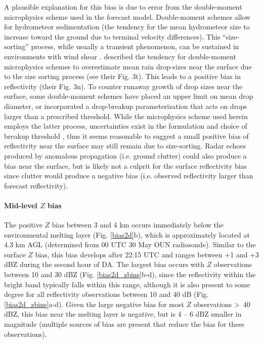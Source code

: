 A plausible explanation for this bias is due to error from the double-moment microphysics scheme used in the forecast model. Double-moment schemes allow for hydrometeor sedimentation (the tendency for the mean hydrometeor size to increase toward the ground due to terminal velocity differences). This “size-sorting” process, while usually a transient phenomenon, can be sustained in environments with wind shear \citep{kumjianryzhkov12}. \citet{milbrandtyau05} described the tendency for double-moment microphysics schemes to overestimate mean rain drop-sizes near the surface due to the size sorting process (see their Fig. 3t). This leads to a positive bias in reflectivity (their Fig. 3n). To counter runaway growth of drop sizes near the surface, some double-moment schemes have placed an upper limit on mean drop diameter, or incorporated a drop-breakup parameterization that acts on drops larger than a prescribed threshold. While the microphysics scheme used herein employs the latter process, uncertainties exist in the formulation and choice of breakup threshold \citep{morrisonetal12}, thus it seems reasonable to suggest a small positive bias of reflectivity near the surface may still remain due to size-sorting. Radar echoes produced by anomalous propagation (i.e. ground clutter) could also produce a bias near the surface, but is likely not a culprit for the surface reflectivity bias since clutter would produce a negative bias (i.e. observed reflectivity larger than forecast reflectivity).

\paragraph{Mid-level \(Z\) bias}
The positive \(Z\) bias between 3 and 4 km occurs immediately below the environmental melting layer (Fig. \ref{bias2d}b), which is approximately located at 4.3 km AGL (determined from 00 UTC 30 May OUN radiosonde). Similar to the surface \(Z\) bias, this bias develops after 22:15 UTC and ranges between +1 and +3 dBZ during the second hour of DA. The largest bias occurs with \(Z\) observations between 10 and 30 dBZ (Fig. \ref{bias2d_zbins}b-d), since the reflectivity within the bright band typically falls within this range, although it is also present to some degree for all reflectivity observations between 10 and 40 dB (Fig. \ref{bias2d_zbins}a-d). Given the large negative bias for most \(Z\) observations \textgreater\, 40 dBZ, this bias near the melting layer is negative, but is 4 -- 6 dBZ smaller in magnitude (multiple sources of bias are present that reduce the bias for these observations).

